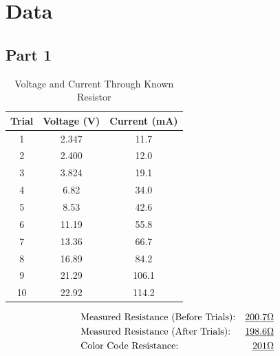 \documentclass[twocolumn,english]{IEEEtran}
\theoremstyle{plain}
\theoremstyle{plain}
\begin{document}
\section{Data}
\subsection*{\textbf{Part 1}}
  \begin{table}[H]
  \caption{Voltage and Current Through Known Resistor}
  \centering{}
  \label{tb:data_part1}
  \begin{tabular}{|c|c|c|}
  \hline
  \textbf{Trial} & \textbf{Voltage (V)} & \textbf{Current (mA)} \\ \hline
  1              & 2.347                & 11.7                  \\ \hline
  2              & 2.400                & 12.0                  \\ \hline
  3              & 3.824                & 19.1                  \\ \hline
  4              & 6.82                 & 34.0                  \\ \hline
  5              & 8.53                 & 42.6                  \\ \hline
  6              & 11.19                & 55.8                  \\ \hline
  7              & 13.36                & 66.7                  \\ \hline
  8              & 16.89                & 84.2                  \\ \hline
  9              & 21.29                & 106.1                 \\ \hline
  10             & 22.92                & 114.2                 \\ \hline
  \end{tabular}
  \end{table}
  \begin{align*}
  &\text{Measured Resistance (Before Trials):} 		&\text{\underline{200.7$\Omega$} } 	\\
  &\text{Measured Resistance (After Trials):} 		&\text{\underline{198.6$\Omega$} }	\\
  &\text{Color Code Resistance:}			&\text{\underline{201$\Omega$} }	\\
  \end{align*}
\end{document}
